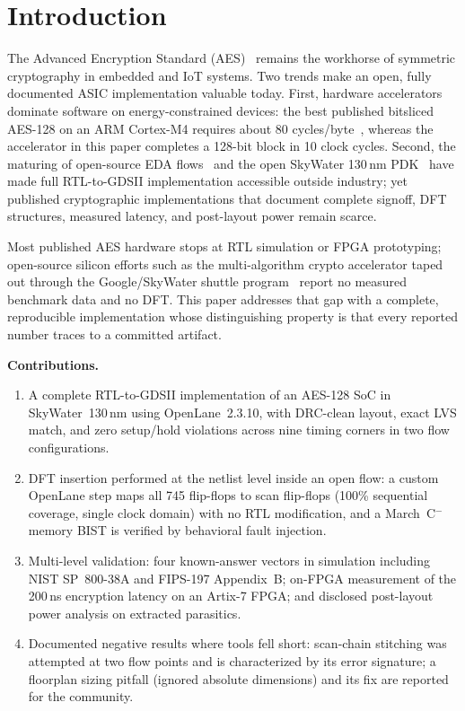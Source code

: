 \documentclass[conference]{IEEEtran}
\begin{document}
\section{Introduction}
The Advanced Encryption Standard (AES)~\cite{fips197} remains the workhorse of
symmetric cryptography in embedded and IoT systems. Two trends make an
open, fully documented ASIC implementation valuable today. First, hardware
accelerators dominate software on energy-constrained devices: the best
published bitsliced AES-128 on an ARM Cortex-M4 requires about 80
cycles/byte~\cite{kimseo25}, whereas the accelerator in this paper completes
a 128-bit block in 10 clock cycles. Second, the maturing of open-source EDA
flows~\cite{openlane,openroad,yosys} and the open SkyWater 130\,nm
PDK~\cite{sky130} have made full RTL-to-GDSII implementation accessible
outside industry; yet published cryptographic implementations that document
complete signoff, DFT structures, measured latency, and post-layout power
remain scarce.

Most published AES hardware stops at RTL simulation or FPGA prototyping;
open-source silicon efforts such as the multi-algorithm crypto accelerator
taped out through the Google/SkyWater shuttle program~\cite{singhali} report
no measured benchmark data and no DFT. This paper addresses that gap with a
complete, reproducible implementation whose distinguishing property is that
every reported number traces to a committed artifact.

\textbf{Contributions.}
\begin{enumerate}
\item A complete RTL-to-GDSII implementation of an AES-128 SoC in
SkyWater~130\,nm using OpenLane~2.3.10, with DRC-clean layout, exact LVS
match, and zero setup/hold violations across nine timing corners in two flow
configurations.
\item DFT insertion performed at the netlist level inside an open flow: a
custom OpenLane step maps all 745 flip-flops to scan flip-flops (100\%
sequential coverage, single clock domain) with no RTL modification, and a
March~C$^-$ memory BIST is verified by behavioral fault injection.
\item Multi-level validation: four known-answer vectors in simulation
including NIST SP~800-38A and FIPS-197 Appendix~B; on-FPGA measurement of the
200\,ns encryption latency on an Artix-7 FPGA; and disclosed post-layout
power analysis on extracted parasitics.
\item Documented negative results where tools fell short: scan-chain
stitching was attempted at two flow points and is characterized by its error
signature; a floorplan sizing pitfall (ignored absolute dimensions) and its
fix are reported for the community.
\end{enumerate}
\end{document}
